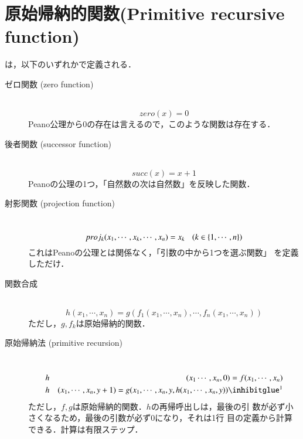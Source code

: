 \section{原始帰納的関数(Primitive recursive function)}
は，以下のいずれかで定義される．
\begin{description}
 \item[ゼロ関数 (zero function)] \mbox{} \\
            \[
             zero(x) = 0
            \]
            Peano公理から0の存在は言えるので，このような関数は存在する．

 \item[後者関数 (successor function)] \mbox{} \\
            \[
             succ(x) = x + 1
            \]
            Peanoの公理の1つ，「自然数の次は自然数」を反映した関数．

 \item[射影関数 (projection function)] \mbox{} \\
            \[
             proj_k (x_1, \cdots , x_k , \cdots , x_n) = x_k
            \hspace{2ex} (k \in \{1, \cdots , n\})
            \]
            これはPeanoの公理とは関係なく，「引数の中から1つを選ぶ関数」
            を定義しただけ．

 \item[関数合成] \mbox{} \\
            \[
            h(x_1 , \cdots , x_n) = g ( f_1 (x_1, \cdots , x_n), \cdots
            , f_n (x_1 , \cdots, x_n))
            \]
            ただし，$g, f_k$は原始帰納的関数．

 \item[原始帰納法 (primitive recursion)] \mbox{} \\
            \begin{eqnarray*}
            &h& ( x_1 \cdots , x_n , 0) = f ( x_1 , \cdots , x_n) \\
             &h& (x_1, \cdots , x_n , y+1) = g(x_1, \cdots, x_n, y,
              h(x_1 , \cdots, x_n , y))  \footnotemark
            \end{eqnarray*}
            ただし，$f, g$は原始帰納的関数．$h$の再帰呼出しは，最後の引
            数が必ず小さくなるため，最後の引数が必ず$0$になり，それは1行
            目の定義から計算できる．計算は有限ステップ．
\end{description}

